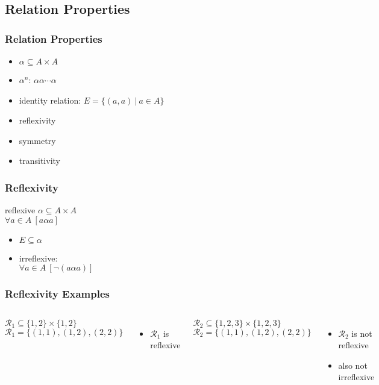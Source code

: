 \documentclass[dvipsnames]{beamer}
\begin{document}
\subsection{Relation Properties}

\begin{frame}
  \frametitle{Relation Properties}

  \begin{itemize}
    \item $\alpha \subseteq A \times A$
    \item $\alpha^n$: $\alpha \alpha \cdots \alpha$
    \item \alert{identity relation}: $E = \{(a,a)~|~a \in A\}$

    \pause
    \bigskip
    \item reflexivity
    \item symmetry
    \item transitivity
  \end{itemize}
\end{frame}

\begin{frame}
  \frametitle{Reflexivity}

  \begin{block}{reflexive}
    $\alpha \subseteq A \times A$\\
    $\forall a \in A~[a \alpha a]$
  \end{block}

  \pause
  \begin{itemize}
    \item $E \subseteq \alpha$

    \pause
    \item irreflexive:\\
      $\forall a \in A~[\neg (a \alpha a)]$
  \end{itemize}
\end{frame}

\begin{frame}
  \frametitle{Reflexivity Examples}

  \begin{columns}[t]
    $\mathcal{R}_1 \subseteq \{1,2\} \times \{1,2\}$\\
    $\mathcal{R}_1 = \{(1,1), (1,2), (2,2)\}$

    \medskip
    \begin{itemize}
      \item $\mathcal{R}_1$ is reflexive
    \end{itemize}

    \pause
    $\mathcal{R}_2 \subseteq \{1,2,3\} \times \{1,2,3\}$\\
    $\mathcal{R}_2 = \{(1,1), (1,2), (2,2)\}$

    \medskip
    \begin{itemize}
      \item $\mathcal{R}_2$ is not reflexive
      \item also not irreflexive
    \end{itemize}
  \end{columns}
\end{frame}
\end{document}
